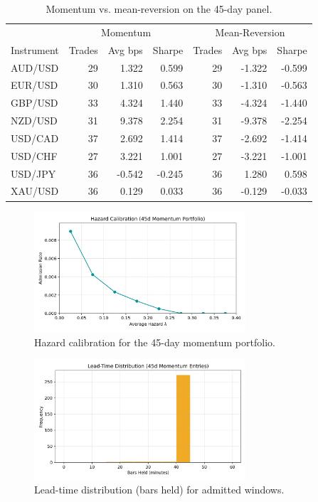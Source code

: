 \documentclass[11pt]{article}
\begin{document}
\begin{table}[h]
  \centering
  \caption{Momentum vs. mean-reversion on the 45-day panel.}
  \label{tab:mrcontrol}
  \begin{tabular}{lrrrrrr}
    \toprule
    & \multicolumn{3}{c}{Momentum} & \multicolumn{3}{c}{Mean-Reversion} \\
    \cmidrule(lr){2-4} \cmidrule(lr){5-7}
    Instrument & Trades & Avg bps & Sharpe & Trades & Avg bps & Sharpe \\
    \midrule
    AUD/USD & 29 & 1.322 & 0.599 & 29 & -1.322 & -0.599 \\
    EUR/USD & 30 & 1.310 & 0.563 & 30 & -1.310 & -0.563 \\
    GBP/USD & 33 & 4.324 & 1.440 & 33 & -4.324 & -1.440 \\
    NZD/USD & 31 & 9.378 & 2.254 & 31 & -9.378 & -2.254 \\
    USD/CAD & 37 & 2.692 & 1.414 & 37 & -2.692 & -1.414 \\
    USD/CHF & 27 & 3.221 & 1.001 & 27 & -3.221 & -1.001 \\
    USD/JPY & 36 & -0.542 & -0.245 & 36 & 1.280 & 0.598 \\
    XAU/USD & 36 & 0.129 & 0.033 & 36 & -0.129 & -0.033 \\
    \bottomrule
  \end{tabular}
\end{table}

\begin{figure}[t]
  \centering
  \includegraphics[width=0.7\textwidth]{figures/rg_hazard_calibration.png}
  \caption{Hazard calibration for the 45-day momentum portfolio.}
  \label{fig:hazard-calibration}
\end{figure}

\begin{figure}[t]
  \centering
  \includegraphics[width=0.7\textwidth]{figures/rg_lead_time_hist.png}
  \caption{Lead-time distribution (bars held) for admitted windows.}
  \label{fig:leadtime}
\end{figure}
\end{document}
